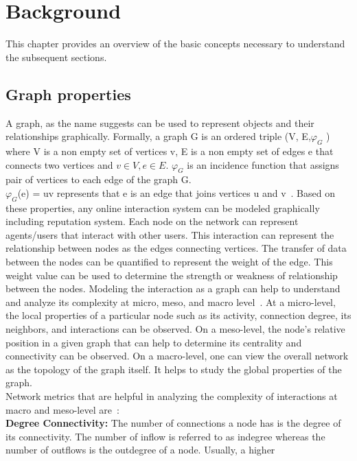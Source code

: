 \chapter{Background} \label{ch:background}
This chapter provides an overview of the basic concepts necessary to understand
the subsequent sections.

\section{Graph properties}
A graph, as the name suggests can be used to represent objects and their
relationships graphically. Formally, a graph G is an ordered triple (V,
E,$\varphi _G$ ) where V is a non empty set of vertices v, E is a non empty set
of edges e that connects two vertices and $v \in V, e \in E$. $\varphi _G$ is
an incidence function that assigns pair of vertices to each edge of the graph
G.\\ $\varphi _G $(e) = uv represents that e is an edge that joins vertices u
and v~\cite{bondy1976graph}.  Based on these properties, any online interaction
system can be modeled graphically including reputation system. Each node on the
network can represent agents/users that interact with other users. This
interaction can represent the relationship between nodes as the edges
connecting vertices. The transfer of data between the nodes can be quantified
to represent the weight of the edge.  This weight value can be used to
determine the strength or weakness of relationship between the nodes.  Modeling
the interaction as a graph can help to understand and analyze its complexity at
micro, meso, and macro level~\cite{gkorou2014exploiting}. At a micro-level, the
local properties of a particular node such as its activity, connection degree,
its neighbors, and interactions can be observed. On a meso-level, the node's
relative position in a given graph that can help to determine its centrality
and connectivity can be observed. On a macro-level, one can view the overall
network as the topology of the graph itself. It helps to study the global
properties of the graph.\\ 
Network metrics that are helpful in analyzing the complexity of
interactions at macro and meso-level are~\cite{gkorou2014exploiting}: \\
\textbf{Degree Connectivity:} The number of connections a node has is the
degree of its connectivity. The number of inflow is referred to as indegree
whereas the number of outflows is the outdegree of a node. Usually, a higher
